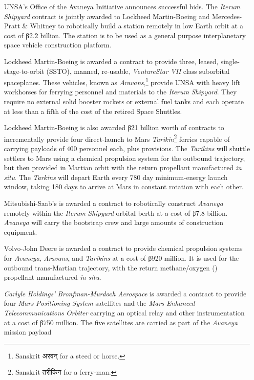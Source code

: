 UNSA's Office of the Avaneya Initiative announces successful bids. The {\it Iterum Shipyard} contract is jointly awarded to Lockheed Martin-Boeing and Mercedes-Pratt & Whitney to robotically build a station remotely in low Earth orbit at a cost of β2.2 billion. The station is to be used as a general purpose interplanetary space vehicle construction platform.

Lockheed Martin-Boeing is awarded a contract to provide three, leased, single-stage-to-orbit (SSTO), manned, re-usable, {\it VentureStar VII} class suborbital spaceplanes. These vehicles, known as {\it Aravans},\footnote{Sanskrit अरवन् for a steed or horse.} provide UNSA with heavy lift workhorses for ferrying personnel and materials to the {\it Iterum Shipyard}. They require no external solid booster rockets or external fuel tanks and each operate at less than a fifth of the cost of the retired Space Shuttles.

Lockheed Martin-Boeing is also awarded β21 billion worth of contracts to incrementally provide four direct-launch to Mars {\it Tarikin}\footnote{Sanskrit तरीकिन for a ferry-man.} ferries capable of carrying payloads of 400 personnel each, plus provisions. The {\it Tarikins} will shuttle settlers to Mars using a chemical  propulsion system for the outbound trajectory, but then provided in Martian orbit with the return  propellant manufactured {\it in situ}. The {\it Tarkins} will depart Earth every 780 day minimum-energy launch window, taking 180 days to arrive at Mars in constant rotation with each other.

Mitsubishi-Saab's is awarded a contract to robotically construct {\it Avaneya} remotely within the {\it Iterum Shipyard} orbital berth at a cost of β7.8 billion. {\it Avaneya} will carry the bootstrap crew and large amounts of construction equipment.

Volvo-John Deere is awarded a contract to provide chemical propulsion systems for {\it Avaneya}, {\it Aravans}, and {\it Tarikins} at a cost of β920 million. It is used for the outbound trans-Martian trajectory, with the return methane/oxygen () propellant manufactured {\it in situ}.

{\it Carlyle Holdings'} {\it Bronfman-Murdoch Aerospace} is awarded a contract to provide four {\it Mars Positioning System} satellites and the {\it Mars Enhanced Telecommunications Orbiter} carrying an optical relay and other instrumentation at a cost of β750 million. The five satellites are carried as part of the {\it Avaneya} mission payload
\StopTimelineDate

